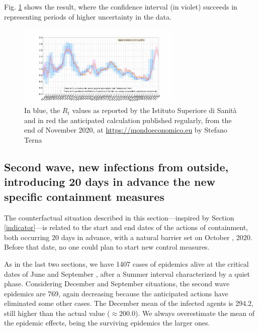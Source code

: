 \documentclass[graybox]{svmult}
\begin{document}
Fig. \ref{Rt} shows the result, where the confidence interval (in violet) succeeds in representing periods of higher uncertainty in the data.

\begin{figure}[t]
\center
\includegraphics[width=0.7\textwidth]{RtEstimation.jpg}
\caption{In blue, the $R_t$ values as reported by the Istituto Superiore di Sanit\`{a} and in red the anticipated calculation published regularly, from the end of November 2020, at \href{https://mondoeconomico.eu}{https://mondoeconomico.eu} by Stefano Terna}
\label{Rt}
\end{figure}


\subsection{Second wave, new infections from outside, introducing 20 days in advance the new specific containment measures}
\label{anticip}

The counterfactual situation described in this section---inspired by Section \ref{indicator}---is related to the start and end dates of the actions of containment, both occurring 20 days in advance, with a natural barrier set on October , 2020. Before that date, no one could plan to start new control measures.

As in the last two sections, we have 1407 cases of epidemics alive at the critical dates of June  and September , after a Summer interval characterized by a quiet phase.
Considering December  and September  situations, the second wave epidemics are 769, again decreasing because the anticipated actions have eliminated some other cases. The December mean of the infected agents is 294.2, still higher than the actual value ($\approx$200.0). We always overestimate the mean of the epidemic effects, being the surviving epidemics the larger ones.
\end{document}
